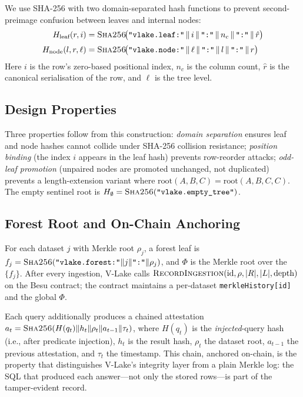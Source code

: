\documentclass[10pt,twocolumn]{article}
\begin{document}
We use SHA-256 with two domain-separated hash functions to prevent
second-preimage confusion between leaves and internal nodes:
%
\begin{align}
H_{\text{leaf}}(r, i) &= \textsc{Sha256}\!\bigl(
  \texttt{"vlake.leaf:"} \,\|\, i \,\|\, \texttt{":"} \,\|\,
  n_c \,\|\, \texttt{":"} \,\|\, \hat{r}\bigr) \\[2pt]
H_{\text{node}}(l, r, \ell) &= \textsc{Sha256}\!\bigl(
  \texttt{"vlake.node:"} \,\|\, \ell \,\|\, \texttt{":"} \,\|\,
  l \,\|\, \texttt{":"} \,\|\, r\bigr)
\end{align}
%
\noindent
Here $i$ is the row's zero-based positional index, $n_c$ is the
column count, $\hat{r}$ is the canonical serialisation of the row,
and $\ell$ is the tree level.

\subsection{Design Properties}

Three properties follow from this construction:
\emph{domain separation} ensures leaf and node hashes cannot
collide under SHA-256 collision resistance;
\emph{position binding} (the index $i$ appears in the leaf hash)
prevents row-reorder attacks;
\emph{odd-leaf promotion} (unpaired nodes are promoted unchanged,
not duplicated) prevents a length-extension variant where
$\text{root}(A,B,C) = \text{root}(A,B,C,C)$.
The empty sentinel root is
$H_\emptyset = \textsc{Sha256}(\texttt{"vlake.empty\_tree"})$.

\subsection{Forest Root and On-Chain Anchoring}

For each dataset $j$ with Merkle root $\rho_j$, a forest leaf is
$f_j = \textsc{Sha256}(\texttt{"vlake.forest:"} \| j \| \texttt{":"} \| \rho_j)$,
and $\Phi$ is the Merkle root over the $\{f_j\}$. After every
ingestion, V-Lake calls
$\textsc{RecordIngestion}(\text{id}, \rho, |R|, |L|, \text{depth})$
on the Besu contract; the contract maintains a per-dataset
\texttt{merkleHistory[id]} and the global $\Phi$.

Each query additionally produces a chained attestation
$a_t = \textsc{Sha256}(H(q_t) \| h_t \| \rho_t \| a_{t-1} \| \tau_t)$,
where $H(q_t)$ is the \emph{injected}-query hash (i.e., after
predicate injection), $h_t$ is the result hash, $\rho_t$ the
dataset root, $a_{t-1}$ the previous attestation, and $\tau_t$ the
timestamp. This chain, anchored on-chain, is the property that
distinguishes V-Lake's integrity layer from a plain Merkle log: the
SQL that produced each answer---not only the stored rows---is part
of the tamper-evident record.
\end{document}
